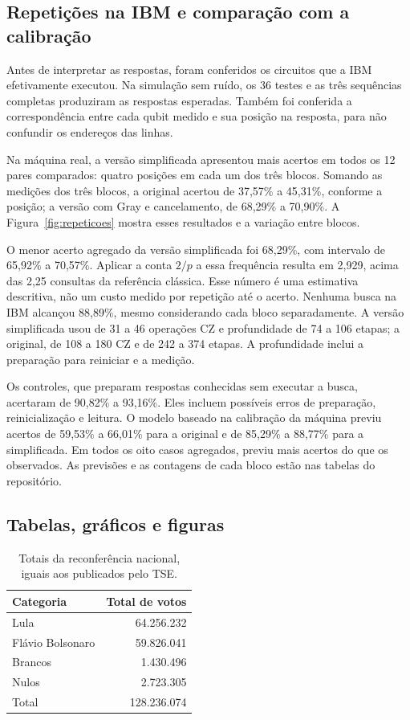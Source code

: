 \subsection{Repetições na IBM e comparação com a calibração}
Antes de interpretar as respostas, foram conferidos os circuitos que a IBM efetivamente executou. Na simulação sem ruído, os 36 testes e as três sequências completas produziram as respostas esperadas. Também foi conferida a correspondência entre cada qubit medido e sua posição na resposta, para não confundir os endereços das linhas.

Na máquina real, a versão simplificada apresentou mais acertos em todos os 12 pares comparados: quatro posições em cada um dos três blocos. Somando as medições dos três blocos, a original acertou de 37,57\% a 45,31\%, conforme a posição; a versão com Gray e cancelamento, de 68,29\% a 70,90\%. A Figura~\ref{fig:repeticoes} mostra esses resultados e a variação entre blocos.

O menor acerto agregado da versão simplificada foi 68,29\%, com intervalo de 65,92\% a 70,57\%. Aplicar a conta $2/p$ a essa frequência resulta em 2,929, acima das 2,25 consultas da referência clássica. Esse número é uma estimativa descritiva, não um custo medido por repetição até o acerto. Nenhuma busca na IBM alcançou 88,89\%, mesmo considerando cada bloco separadamente. A versão simplificada usou de 31 a 46 operações CZ e profundidade de 74 a 106 etapas; a original, de 108 a 180 CZ e de 242 a 374 etapas. A profundidade inclui a preparação para reiniciar e a medição.

Os controles, que preparam respostas conhecidas sem executar a busca, acertaram de 90,82\% a 93,16\%. Eles incluem possíveis erros de preparação, reinicialização e leitura. O modelo baseado na calibração da máquina previu acertos de 59,53\% a 66,01\% para a original e de 85,29\% a 88,77\% para a simplificada. Em todos os oito casos agregados, previu mais acertos do que os observados. As previsões e as contagens de cada bloco estão nas tabelas do repositório.

\subsection{Tabelas, gráficos e figuras}


\begin{table}[!ht]
\caption{Totais da reconferência nacional, iguais aos publicados pelo TSE.}
\label{tab:nacional}
\centering\small
\begin{tabular}{@{}lr@{}}
\toprule
Categoria & Total de votos \\
\midrule
Lula & 64.256.232 \\
Flávio Bolsonaro & 59.826.041 \\
Brancos & 1.430.496 \\
Nulos & 2.723.305 \\
Total & 128.236.074 \\
\bottomrule
\end{tabular}
\end{table}

